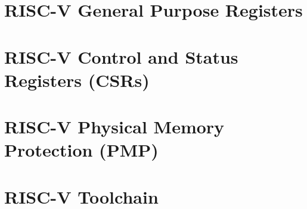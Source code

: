 \lipsum[1]

\section{RISC-V General Purpose Registers}
\label{sec:riscv_reg}

\lipsum[1]

\section{RISC-V Control and Status Registers (CSRs)}
\label{sec:riscv_csrs}

\lipsum[1]

\section{RISC-V Physical Memory Protection (PMP)}
\label{sec:riscv_pmp}

\lipsum[1]

\section{RISC-V Toolchain}
\label{sec:riscv_toolchain}

\lipsum[1]